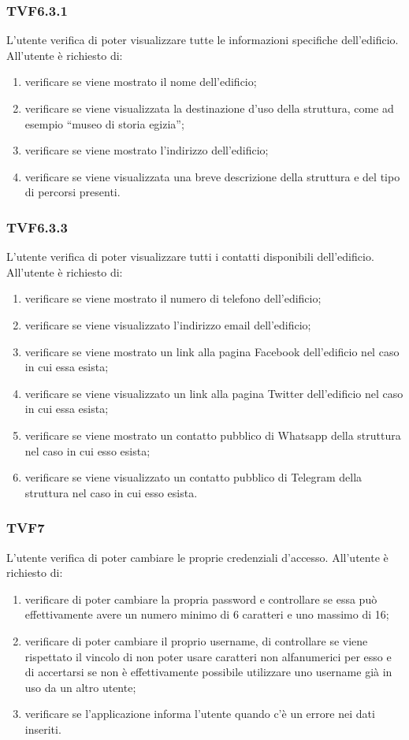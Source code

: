 		\subsubsection{TVF6.3.1}
			L'utente verifica di poter visualizzare tutte le informazioni specifiche dell'edificio.
			All'utente è richiesto di:
			\begin{enumerate}
				\item verificare se viene mostrato il nome dell'edificio;
				\item verificare se viene visualizzata la destinazione d'uso della struttura, come ad esempio ``museo di storia egizia'';
				\item verificare se viene mostrato l'indirizzo dell'edificio;
				\item verificare se viene visualizzata una breve descrizione della struttura e del tipo di percorsi presenti.
			\end{enumerate}
		\subsubsection{TVF6.3.3}
			L'utente verifica di poter visualizzare tutti i contatti disponibili dell'edificio.
			All'utente è richiesto di:
			\begin{enumerate}
				\item verificare se viene mostrato il numero di telefono dell'edificio;
				\item verificare se viene visualizzato l'indirizzo email dell'edificio;
				\item verificare se viene mostrato un link alla pagina Facebook dell'edificio nel caso in cui essa esista;
				\item verificare se viene visualizzato un link alla pagina Twitter dell'edificio nel caso in cui essa esista;
				\item verificare se viene mostrato un contatto pubblico di Whatsapp della struttura nel caso in cui esso esista;
				\item verificare se viene visualizzato un contatto pubblico di Telegram della struttura nel caso in cui esso esista.
			\end{enumerate}
		\subsubsection{TVF7}
			L'utente verifica di poter cambiare le proprie credenziali d'accesso.
			All'utente è richiesto di:
			\begin{enumerate}
				\item verificare di poter cambiare la propria password e controllare se essa può effettivamente avere un numero minimo di 6 caratteri e uno massimo di 16;
				\item verificare di poter cambiare il proprio username, di controllare se viene rispettato il vincolo di non poter usare caratteri non alfanumerici per esso e di accertarsi se non è effettivamente possibile utilizzare uno username già in uso da un altro utente;
				\item verificare se l'applicazione informa l'utente quando c'è un errore nei dati inseriti.
			\end{enumerate}
